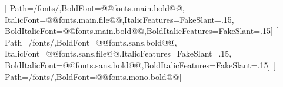 \usepackage[no-math]{fontspec}
\setmainfont{@@fonts.main.file@@}[
  Path=\olpath/fonts/,BoldFont=@@fonts.main.bold@@,
  ItalicFont=@@fonts.main.file@@,ItalicFeatures={FakeSlant=.15},
  BoldItalicFont=@@fonts.main.bold@@,BoldItalicFeatures={FakeSlant=.15}]
\setsansfont{@@fonts.sans.file@@}[
  Path=\olpath/fonts/,BoldFont=@@fonts.sans.bold@@,
  ItalicFont=@@fonts.sans.file@@,ItalicFeatures={FakeSlant=.15},
  BoldItalicFont=@@fonts.sans.bold@@,BoldItalicFeatures={FakeSlant=.15}]
\setmonofont{@@fonts.mono.file@@}[
  Path=\olpath/fonts/,BoldFont=@@fonts.mono.bold@@]
